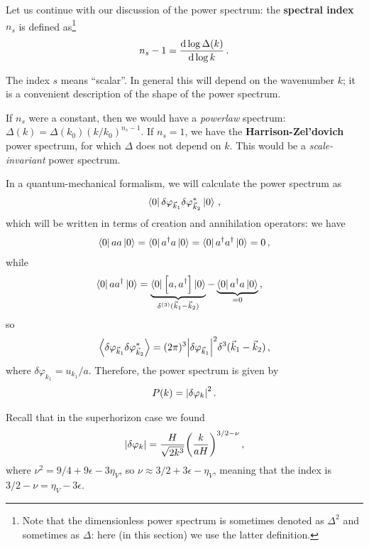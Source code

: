 \documentclass[main.tex]{subfiles}
\begin{document}
Let us continue with our discussion of the power spectrum: the \textbf{spectral index} \(n_s\) is defined as\footnote{Note that the dimensionless power spectrum is sometimes denoted as \(\Delta^2\) and sometimes as \(\Delta \): here (in this section) we use the latter definition.}
%
\begin{align}
n_s - 1 = \dv{\log \Delta (k)}{\log k}
\,.
\end{align}

The index \(s\) means ``scalar''. 
In general this will depend on the wavenumber \(k\); it is a convenient description of the shape of the power spectrum. 

If \(n_s\) were a constant, then we would have a \emph{powerlaw} spectrum: \(\Delta (k) = \Delta (k_0 ) (k / k_0 )^{n_s - 1}\). 
If \(n_s = 1\), we have the \textbf{Harrison-Zel'dovich} power spectrum, for which \(\Delta \) does not depend on \(k\).
This would be a \emph{scale-invariant} power spectrum.

In a quantum-mechanical formalism, we will calculate the power spectrum as 
%
\begin{align}
\bra{0} \delta \varphi _{\vec{k}_1} \delta \varphi _{\vec{k}_2}^{*} \ket{0}
\,,
\end{align}
%
which will be written in terms of creation and annihilation operators: we have 
%
\begin{align}
\bra{0} a a \ket{0}=
\bra{0} a ^\dag a  \ket{0}=
\bra{0} a ^\dag a ^\dag \ket{0}= 0
\,,
\end{align}
%
while 
%
\begin{align}
\bra{0} a a ^\dag \ket{0} &= \underbrace{\bra{0} \qty[a, a ^\dag] \ket{0}}_{ \delta^{(3)} (\vec{k}_1 - \vec{k}_2)} - \underbrace{\bra{0} a ^\dag a \ket{0}}_{= 0} 
\,,
\end{align}
%
so 
%
\begin{align}
\expval{ \delta \varphi _{\vec{k}_1} \delta \varphi _{\vec{k}_2}^{*}} = (2 \pi )^3 \abs{ \delta \varphi _{\vec{k}_1}}^2 \delta^3(\vec{k}_1 - \vec{k}_2)
\,,
\end{align}
%
where \(\delta \varphi _{k_1} = u_{k_1} / a\). 
Therefore, the power spectrum is given by 
%
\begin{align}
P(k) = \abs{ \delta \varphi _k}^2
\,.
\end{align}

Recall that in the superhorizon case we found 
%
\begin{align}
\abs{ \delta \varphi _k} = \frac{H}{\sqrt{2 k^3}} \qty( \frac{k}{aH})^{3/2 - \nu }
\,,
\end{align}
%
where \(\nu^2 = 9/4 + 9 \epsilon - 3 \eta _V\), so \(\nu \approx 3/2 + 3\epsilon - \eta _V \), meaning that the index is \(3/2 - \nu = \eta _V - 3 \epsilon \). 
\end{document}
